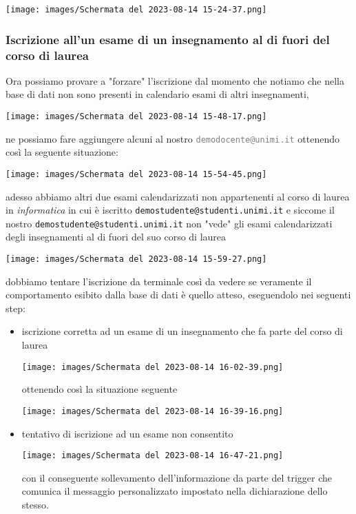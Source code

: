 \documentclass{article}
\newcommand{\attr}[1]{\texttt{\textcolor{gray}{#1}}}
\newcommand{\und}[0]{\textunderscore}
\begin{document}
\texttt{[image: images/Schermata del 2023-08-14 15-24-37.png]}

\subsubsection{Iscrizione all'un esame di un insegnamento al di fuori del corso di laurea}

Ora possiamo provare a "forzare" l'iscrizione dal momento che notiamo che nella base di dati non sono presenti in calendario esami di altri insegnamenti,

\texttt{[image: images/Schermata del 2023-08-14 15-48-17.png]}

ne possiamo fare aggiungere alcuni al nostro \attr{demo\und docente@unimi.it} ottenendo così la seguente situazione:

\texttt{[image: images/Schermata del 2023-08-14 15-54-45.png]}

adesso abbiamo altri due esami calendarizzati non appartenenti al corso di laurea in \textit{informatica} in cui è iscritto \texttt{demo\und studente@studenti.unimi.it} e siccome il nostro \texttt{demo\und studente@studenti.unimi.it} non "vede" gli esami calendarizzati degli insegnamenti al di fuori del suo corso di laurea

\texttt{[image: images/Schermata del 2023-08-14 15-59-27.png]}

dobbiamo tentare l'iscrizione da terminale così da vedere se veramente il comportamento esibito dalla base di dati è quello atteso, eseguendolo nei seguenti step:
\begin{itemize}
    \item iscrizione corretta ad un esame di un insegnamento che fa parte del corso di laurea

    \texttt{[image: images/Schermata del 2023-08-14 16-02-39.png]}

    ottenendo così la situazione seguente

    \texttt{[image: images/Schermata del 2023-08-14 16-39-16.png]}

    \item tentativo di iscrizione ad un esame non consentito

    \texttt{[image: images/Schermata del 2023-08-14 16-47-21.png]}

    con il conseguente sollevamento dell'informazione da parte del trigger che comunica il messaggio personalizzato impostato nella dichiarazione dello stesso.

\end{itemize}
\end{document}
